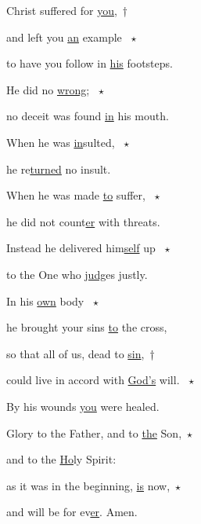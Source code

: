 \noindent Christ suffered for \uline{you},~†~\nopagebreak

and left you \uline{an} example ~$\star$~\nopagebreak

to have you follow in \uline{his} footsteps.

\noindent He did no \uline{wrong}; ~$\star$~\nopagebreak

no deceit was found \uline{in} his mouth.

\noindent When he was \uline{in}sulted, ~$\star$~\nopagebreak

he re\uline{turned} no insult.

\noindent When he was made \uline{to} suffer, ~$\star$~\nopagebreak

he did not count\uline{er} with threats.

\noindent Instead he delivered him\uline{self} up ~$\star$~\nopagebreak

to the One who \uline{judg}es justly.

\noindent In his \uline{own} body ~$\star$~\nopagebreak

he brought your sins \uline{to} the cross,

\noindent so that all of us, dead to \uline{sin},~†~\nopagebreak

could live in accord with \uline{God’s} will. ~$\star$~\nopagebreak

By his wounds \uline{you} were healed.

\noindent Glory to the Father, and to \uline{the} Son,~$\star$~\nopagebreak

and to the \uline{Ho}ly Spirit:

\noindent as it was in the beginning, \uline{is} now,~$\star$~\nopagebreak

and will be for ev\uline{er}. Amen.
